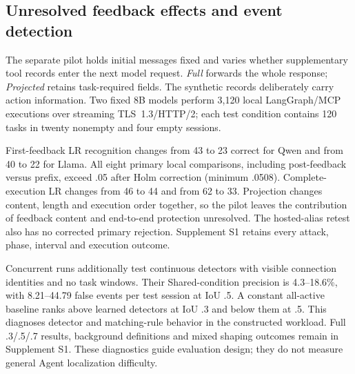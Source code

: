 \subsection{Unresolved feedback effects and event detection}\label{sec:live-study}
The separate pilot holds initial messages fixed and varies whether supplementary tool records enter the next model request. \emph{Full} forwards the whole response; \emph{Projected} retains task-required fields. The synthetic records deliberately carry action information. Two fixed 8B models perform 3,120 local LangGraph/MCP executions over streaming TLS~1.3/HTTP/2; each test condition contains 120 tasks in twenty nonempty and four empty sessions.

First-feedback LR recognition changes from 43 to 23 correct for Qwen and from 40 to 22 for Llama. All eight primary local comparisons, including post-feedback versus prefix, exceed .05 after Holm correction (minimum .0508). Complete-execution LR changes from 46 to 44 and from 62 to 33. Projection changes content, length and execution order together, so the pilot leaves the contribution of feedback content and end-to-end protection unresolved. The hosted-alias retest also has no corrected primary rejection. Supplement S1 retains every attack, phase, interval and execution outcome.

Concurrent runs additionally test continuous detectors with visible connection identities and no task windows. Their Shared-condition precision is 4.3--18.6\%, with 8.21--44.79 false events per test session at IoU .5. A constant all-active baseline ranks above learned detectors at IoU .3 and below them at .5. This diagnoses detector and matching-rule behavior in the constructed workload. Full .3/.5/.7 results, background definitions and mixed shaping outcomes remain in Supplement S1. These diagnostics guide evaluation design; they do not measure general Agent localization difficulty.
